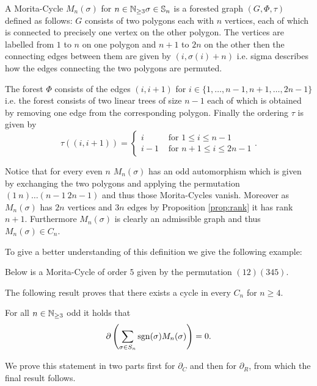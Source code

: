 \begin{definition}
	A Morita-Cycle $M_{n}(\sigma)$ for $n \in \mathbb{N}_{\geq 3} \sigma \in \mathbb{S}_{n}$ is a forested graph $(G,\Phi,\tau)$ defined as follows:
	$G$ consists of two polygons each with $n$ vertices, each of which is connected to precisely one vertex on the other polygon.
	The vertices are labelled from $1$ to $n$ on one polygon and $n+1$ to $2n$ on the other then the connecting edges between them are given by $(i,\sigma(i)+n)$ i.e.
	sigma describes how the edges connecting the two polygons are permuted.

	The forest $\Phi$ consists of the edges $(i,i+1)$ for $i \in \{1,\ldots,n-1, n+1,\ldots,2n-1\}$ i.e. the
	forest consists of two linear trees of size $n-1$ each of which is obtained by removing one edge from the corresponding polygon.
	Finally the ordering $\tau$ is given by
	\[
		\tau((i,i+1)) = \begin{cases}
			i & \text{ for } 1 \leq i \leq n-1\\ 
			i-1 & \text{ for } n+1 \leq i \leq 2n-1
		\end{cases}
	.\] 
\end{definition}
Notice that for every even $n$ $M_{n}(\sigma)$ has an odd automorphism which is given by exchanging the two polygons and applying the permutation $(1\ n) \ldots (n-1\ 2n -1)$ and
thus those Morita-Cycles vanish.
Moreover as $M_{n}(\sigma)$ has $2n$ vertices and $3n$ edges by Proposition \ref{prop:rank} it has rank $n+1$.
Furthermore $M_{n}(\sigma)$ is clearly an admissible graph and thus $M_{n}(\sigma) \in C_{n}$.

To give a better understanding of this definition we give the following example:

\begin{eg}
	Below is a Morita-Cycle of order $5$ given by the permutation $(12)(345)$.
\end{eg}

The following result proves that there exists a cycle in every $C_{n}$ for $n \geq 4$.
\begin{theorem}
	For all $n \in \mathbb{N}_{\geq 3}$ odd it holds that 
	\[
		\partial\left(\sum_{\sigma \in S_{n}} \operatorname{sgn}(\sigma) M_{n}(\sigma)\right) = 0
	.\] 
\end{theorem}

We prove this statement in two parts first for $\partial_{C}$ and then for $\partial_{R}$, from which the final result follows.


